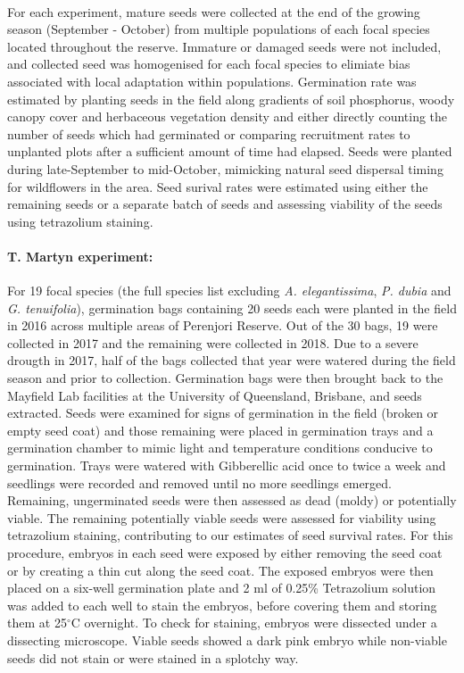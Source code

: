 \documentclass[a4,12pt]{article}
\begin{document}
        \paragraph{}
        For each experiment, mature seeds were collected at the end of the growing season (September - October) from multiple populations of each focal species located throughout the reserve. Immature or damaged seeds were not included, and collected seed was homogenised for each focal species to elimiate bias associated with local adaptation within populations. Germination rate was estimated by planting seeds in the field along gradients of soil phosphorus, woody canopy cover and herbaceous vegetation density and either directly counting the number of seeds which had germinated or comparing recruitment rates to unplanted plots after a sufficient amount of time had elapsed. Seeds were planted during late-September to mid-October, mimicking natural seed dispersal timing for wildflowers in the area. Seed surival rates were estimated using either the remaining seeds or a separate batch of seeds and assessing viability of the seeds using tetrazolium staining. 


        \paragraph{T. Martyn experiment:}
        For 19 focal species (the full species list excluding \textit{A. elegantissima}, \textit{P. dubia} and \textit{G. tenuifolia}), germination bags containing 20 seeds each were planted in the field in 2016 across multiple areas of Perenjori Reserve. Out of the 30 bags, 19 were collected in 2017 and the remaining were collected in 2018. Due to a severe drougth in 2017, half of the bags collected that year were watered during the field season and prior to collection. Germination bags were then brought back to the Mayfield Lab facilities at the University of Queensland, Brisbane, and seeds extracted. Seeds were examined for signs of germination in the field (broken or empty seed coat) and those remaining were placed in germination trays and a germination chamber to mimic light and temperature conditions conducive to germination. Trays were watered with Gibberellic acid once to twice a week and seedlings were recorded and removed until no more seedlings emerged. Remaining, ungerminated seeds were then assessed as dead (moldy) or potentially viable. The remaining potentially viable seeds were assessed for viability using tetrazolium staining, contributing to our estimates of seed survival rates. For this procedure, embryos in each seed were exposed by either removing the seed coat or by creating a thin cut along the seed coat. The exposed embryos were then placed on a six-well germination plate and 2 ml of 0.25\% Tetrazolium solution was added to each well to stain the embryos, before covering them and storing them at 25$^{\circ}$C overnight. To check for staining, embryos were dissected under a dissecting microscope. Viable seeds showed a dark pink embryo while non-viable seeds did not stain or were stained in a splotchy way.
\end{document}
